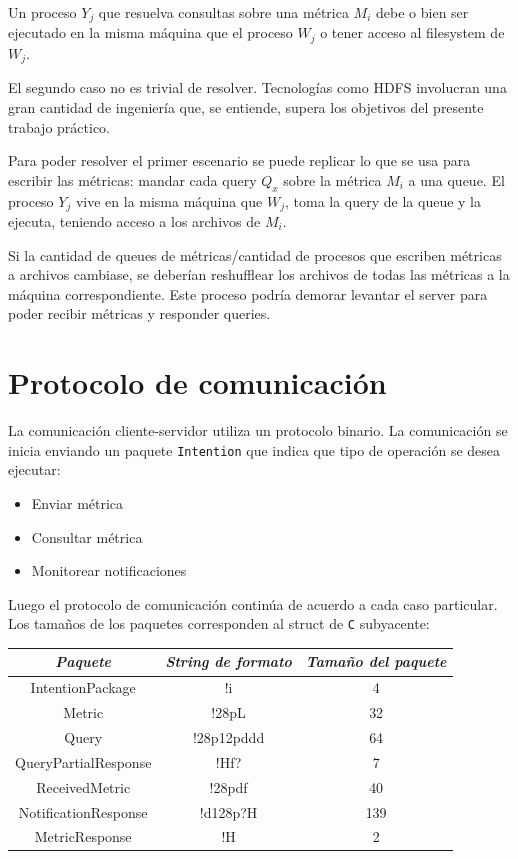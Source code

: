 \documentclass[titlepage,a4paper,oneside]{article}
\begin{document}
Un proceso $Y_j$ que resuelva consultas sobre una métrica $M_i$ debe o bien ser ejecutado en la misma máquina que el proceso $W_j$ o tener acceso al filesystem de $W_j$.

El segundo caso no es trivial de resolver. Tecnologías como HDFS\cite{HDFS} involucran una gran cantidad de ingeniería que, se entiende, supera los objetivos del presente trabajo práctico.

Para poder resolver el primer escenario se puede replicar lo que se usa para escribir las métricas: mandar cada query $Q_x$ sobre la métrica $M_i$ a una queue. El proceso $Y_j$ vive en la misma máquina que $W_j$, toma la query de la queue y la ejecuta, teniendo acceso a los archivos de $M_i$.

Si la cantidad de queues de métricas/cantidad de procesos que escriben métricas a archivos cambiase, se deberían reshufflear los archivos de todas las métricas a la máquina correspondiente. Este proceso podría demorar levantar el server para poder recibir métricas y responder queries.

\section{Protocolo de comunicación}
La comunicación cliente-servidor utiliza un protocolo binario. La comunicación se inicia enviando un paquete \texttt{Intention}\cite{IntentionPackage} que indica que tipo de operación se desea ejecutar:
\begin{itemize}
	\item Enviar métrica
	\item Consultar métrica
	\item Monitorear notificaciones
\end{itemize}

Luego el protocolo de comunicación continúa de acuerdo a cada caso particular. Los tamaños de los paquetes corresponden al struct de \texttt{C} subyacente:

\begin{table}[H]
\centering
\begin{tabular}{c|c|c}
\textit{Paquete}     & \textit{String de formato} & \textit{Tamaño del paquete}  \\
\hline
IntentionPackage     & !i                         & 4                            \\
Metric               & !28pL                      & 32                           \\
Query                & !28p12pddd                 & 64                           \\
QueryPartialResponse & !Hf?                       & 7                            \\
ReceivedMetric       & !28pdf                     & 40                           \\
NotificationResponse & !d128p?H                   & 139                          \\
MetricResponse       & !H                         & 2
\end{tabular}
\end{table}
\end{document}
